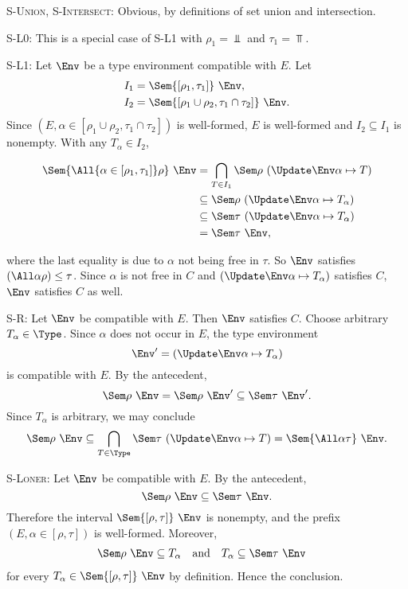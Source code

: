\documentclass{amsart}
\theoremstyle{definition}
\begin{document}
\textsc{S-Union}, \textsc{S-Intersect}: Obvious, by definitions
of set union and intersection.

\textsc{S-L0}: This is a special case of \textsc{S-L1} with
$\rho_1=\Bot$ and $\tau_1=\Top$.

\textsc{S-L1}:
Let $\Env$ be a type environment compatible with $E$. Let
\begin{align*}
I_1 &= \Sem{[\rho_1,\tau_1]}~\Env,\\
I_2 &= \Sem{[\rho_1\cup\rho_2, \tau_1\cap\tau_2]}~\Env.
\end{align*}
Since $(E,\alpha\in [\rho_1\cup\rho_2, \tau_1\cap\tau_2])$ is
well-formed, $E$ is well-formed and $I_2\subseteq I_1$ is
nonempty. With any $T_\alpha\in I_2$,
\begin{samepage}
\begin{align*}
\Sem{\All{\alpha\in[\rho_1,\tau_1]}\rho}~\Env
&=\bigcap_{T\in I_1}\Sem\rho~(\Update\Env\alpha\mapsto T)\\
&\subseteq
\Sem\rho~(\Update\Env\alpha\mapsto T_\alpha)\\
&\subseteq
\Sem\tau~(\Update\Env\alpha\mapsto T_\alpha)\\
&=\Sem\tau~\Env,
\end{align*}
\end{samepage}%
where the last equality is due to $\alpha$ not being free in
$\tau$. So $\Env$ satisfies $(\All\alpha\rho)\le\tau$. Since
$\alpha$ is not free in $C$ and $(\Update\Env\alpha\mapsto
T_\alpha)$ satisfies $C$, $\Env$ satisfies $C$ as well.

\textsc{S-R}: Let $\Env$ be compatible with $E$. Then $\Env$
satisfies $C$. Choose arbitrary $T_\alpha\in\Type$. Since
$\alpha$ does not occur in $E$, the type environment
\[
\Env'=(\Update\Env\alpha\mapsto T_\alpha)
\]
is compatible with $E$. By the antecedent,
\[
\Sem\rho~\Env = \Sem\rho~\Env' \subseteq \Sem\tau~\Env'.
\]
Since $T_\alpha$ is arbitrary, we may conclude
\[
\Sem\rho~\Env
\subseteq
\bigcap_{T\in\Type}\Sem\tau~(\Update\Env\alpha\mapsto T)
=\Sem{\All\alpha\tau}~\Env.
\]

\textsc{S-Loner}: Let $\Env$ be compatible with $E$. By the
antecedent,
\[
\Sem\rho~\Env\subseteq\Sem\tau~\Env.
\]
Therefore the interval $\Sem{[\rho,\tau]}~\Env$ is nonempty, and
the prefix $(E,\alpha\in [\rho,\tau])$ is well-formed. Moreover,
\begin{align*}
\Sem\rho~\Env&\subseteq T_\alpha&
&\mbox{and}&
T_\alpha&\subseteq\Sem\tau~\Env
\end{align*}
for every $T_\alpha\in \Sem{[\rho,\tau]}~\Env$ by definition.
Hence the conclusion.
\end{document}
